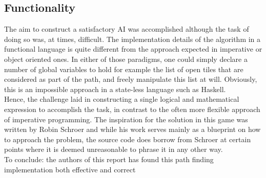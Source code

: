 \documentclass{article}
\begin{document}
\subsection{Functionality}
The aim to construct a satisfactory AI was accomplished although the task of doing so was, at times, difficult. The implementation details of the algorithm in a functional language is quite different from the approach expected in imperative or object oriented ones. In either of those paradigms, one could simply declare a number of global variables to hold for example the list of open tiles that are considered as part of the path, and freely manipulate this list at will. Obviously, this is an impossible approach in a state-less language such as Haskell.\\
\newline
Hence, the challenge laid in constructing a single logical and mathematical expression to accomplish the task, in contrast to the often more flexible approach of imperative programming. The inspiration for the solution in this game was written by Robin Schroer \cite{schroer} and while his work serves mainly as a blueprint on how to approach the problem, the source code does borrow from Schroer at certain points where it is deemed unreasonable to phrase it in any other way.\\
\newline
To conclude: the authors of this report has found this path finding implementation both effective and correct
\end{document}
